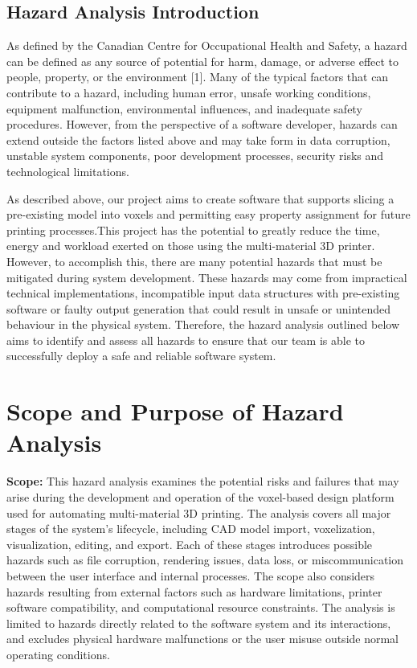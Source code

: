 \documentclass{article}
\begin{document}
\subsection{Hazard Analysis Introduction}

As defined by the Canadian Centre for Occupational Health and Safety, a hazard can be
defined as any source of potential for harm, damage, or adverse effect to people, property,
or the environment [1]. Many of the typical factors that can contribute to a hazard,
including human error, unsafe working conditions, equipment malfunction, environmental
influences, and inadequate safety procedures. However, from the perspective of a software
developer, hazards can extend outside the factors listed above and may take form in data
corruption, unstable system components, poor development processes, security risks and
technological limitations. \par \vspace{1em}

As described above, our project aims to create software that supports slicing a
pre-existing model into voxels and permitting easy property assignment for future
printing processes.This project has the potential to greatly reduce the time, energy
and workload exerted on those using the multi-material 3D printer. However, to accomplish
this, there are many potential hazards that must be mitigated during system development.
These hazards may come from impractical technical implementations, incompatible input data
structures with pre-existing software or faulty output generation that could result in
unsafe or unintended behaviour in the physical system. Therefore, the hazard analysis
outlined below aims to identify and assess all hazards to ensure that our team is able to
successfully deploy a safe and reliable software system.

\section{Scope and Purpose of Hazard Analysis}

\textbf{Scope:} 
This hazard analysis examines the potential risks and failures that may arise during the development and operation of the voxel-based design platform used for automating multi-material 3D printing. The analysis covers all major stages of the system’s lifecycle, including CAD model import, voxelization, visualization, editing, and export. Each of these stages introduces possible hazards such as file corruption, rendering issues, data loss, or miscommunication between the user interface and internal processes. The scope also considers hazards resulting from external factors such as hardware limitations, printer software compatibility, and computational resource constraints. The analysis is limited to hazards directly related to the software system and its interactions, and excludes physical hardware malfunctions or the user misuse outside normal operating conditions.
\end{document}
